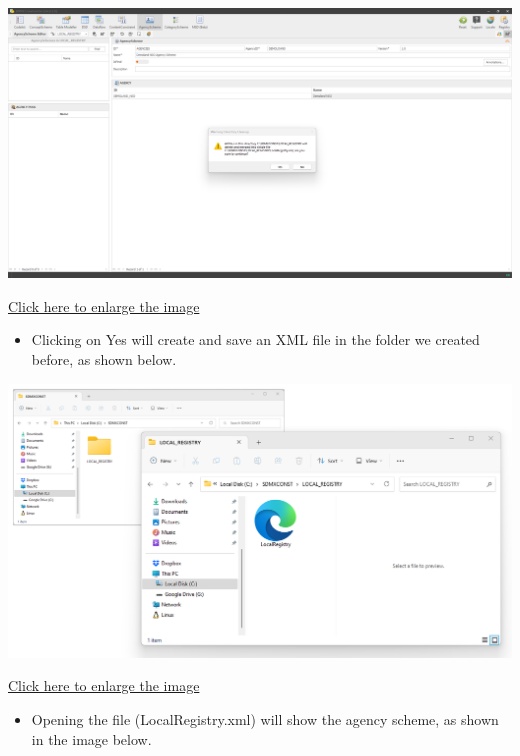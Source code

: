 \documentclass[
]{book}
\providecommand{\tightlist}{%
  \setlength{\itemsep}{0pt}\setlength{\parskip}{0pt}}
\begin{document}
\begin{center}\includegraphics[width=1\linewidth]{./images/image076} \end{center}

\href{images/image076.png}{Click here to enlarge the image}

\begin{itemize}
\tightlist
\item
  Clicking on Yes will create and save an XML file in the folder we created before, as shown below.
\end{itemize}

\begin{center}\includegraphics[width=1\linewidth]{./images/image078} \end{center}

\href{images/image078.png}{Click here to enlarge the image}

\begin{itemize}
\tightlist
\item
  Opening the file (LocalRegistry.xml) will show the agency scheme, as shown in the image below.
\end{itemize}
\end{document}
